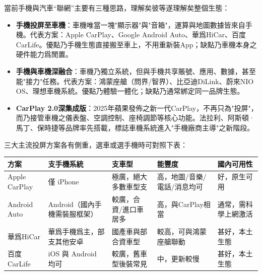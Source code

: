 


當前手機與汽車“聯網”主要有三種思路，理解矣彼等遂理解矣整個生態：

\begin{itemize}
  \item \textbf{手機投屏至車機}：車機唯當一塊"顯示器"與"音箱"，運算與地圖數據皆來自手機。代表方案：Apple CarPlay、Google Android Auto、華爲HiCar、百度CarLife。優點乃手機生態直接搬至車上，不用重新裝App；缺點乃車機本身之硬件能力爲閒置。
  \item \textbf{手機與車機深融合}：車機乃獨立系統，但與手機共享賬號、應用、數據，甚至能"接力"任務。代表方案：鴻蒙座艙（問界/智界）、比亞迪DiLink、蔚來NIO OS、理想車機系統。優點乃體驗一體化；缺點乃通常綁定同一品牌生態。
  \item \textbf{CarPlay 2.0深集成版}：2025年蘋果發佈之新一代CarPlay，不再只為"投屏"，而乃接管車機之儀表盤、空調控制、座椅調節等核心功能。法拉利、阿斯頓·馬丁、保時捷等品牌率先搭載，標誌車機系統進入"手機廠商主導"之新階段。
\end{itemize}


三大主流投屏方案各有側重，選車或選手機時可對照下表：

\begin{center}
\begin{tabularx}{\linewidth}{|X|X|X|X|X|}
\hline
\textbf{方案} & \textbf{支手機系統} & \textbf{支車型} & \textbf{能豐度} & \textbf{國內可用性} \tabularnewline
\hline
Apple CarPlay & 僅 iPhone & 極廣，絕大多數車型支 & 高，地圖/音樂/電話/消息均可 & 好，原生可用 \tabularnewline
Android Auto & Android（國內手機需裝服框架） & 較廣，合資/進口車居多 & 高，與CarPlay相當 & 通常，需科學上網激活 \tabularnewline
華爲HiCar & 華爲手機爲主，部支其他安卓 & 國產車與部合資車型 & 較高，可與鴻蒙座艙聯動 & 甚好，本土生態 \tabularnewline
百度CarLife & iOS 與 Android 均可 & 較廣，舊車型後裝常見 & 中，更新較慢 & 甚好，本土生態 \tabularnewline
\hline
\end{tabularx}
\end{center}


